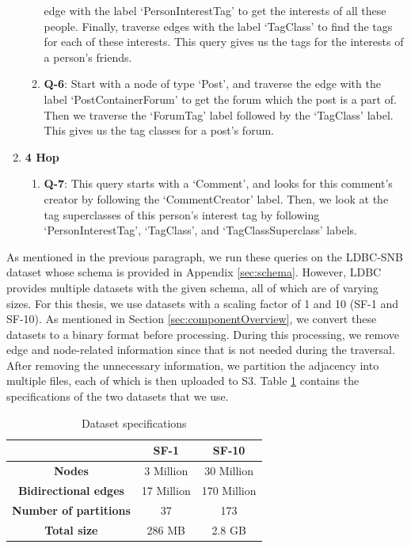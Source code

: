 \begin{enumerate}
\begin{enumerate}
                edge with the label `PersonInterestTag' to get the interests of all
                these people. Finally, traverse edges with the label `TagClass' to
                find the tags for each of these interests. This query gives us
                the tags for the interests of a person's friends.
            \item \textbf{Q-6}: Start with a node of type `Post', and traverse
                the edge with the label `PostContainerForum' to get the forum which
                the post is a part of. Then we traverse the `ForumTag' label
                followed by the `TagClass' label. This gives us the tag classes for
                a post's forum.
        \end{enumerate}
    \item \textbf{4 Hop}
        \begin{enumerate}
            \item \textbf{Q-7}: This query starts with a `Comment', and looks for
                this comment's creator by following the `CommentCreator' label.
                Then, we look at the tag superclasses of this person's interest
                tag by following `PersonInterestTag', `TagClass', and
                `TagClassSuperclass' labels.
        \end{enumerate}
\end{enumerate}

\medskip
As mentioned in the previous paragraph, we run these queries on the
LDBC-SNB\cite{angles2020ldbc} dataset
whose schema is provided in Appendix \ref{sec:schema}. However, LDBC provides
multiple datasets with the given schema, all of which are of varying sizes.
For this thesis, we use datasets with a scaling factor of 1 and 10 (SF-1 and
SF-10). As mentioned in Section \ref{sec:componentOverview}, we convert these
datasets to a binary format before processing. During this processing, we remove
edge and node-related information since that is not needed during the traversal.
After removing the unnecessary information, we partition the adjacency into
multiple files, each of which is then uploaded to S3.
Table \ref{table:dataSpecs} contains the specifications of the two datasets that
we use.


\begin{table}[h!]
 \centering
 \begin{tabular}{|c | c | c |} 
 \hline
  & SF-1 & SF-10 \\ [0.5ex] 
 \hline\hline
     \textbf{Nodes} & 3 Million & 30 Million \\ 
     \textbf{Bidirectional edges} & 17 Million & 170 Million \\
     \textbf{Number of partitions} & 37 & 173 \\
     \textbf{Total size} & 286 MB & 2.8 GB \\
 \hline
 \end{tabular}
 \caption{Dataset specifications}
 \label{table:dataSpecs}
\end{table}

